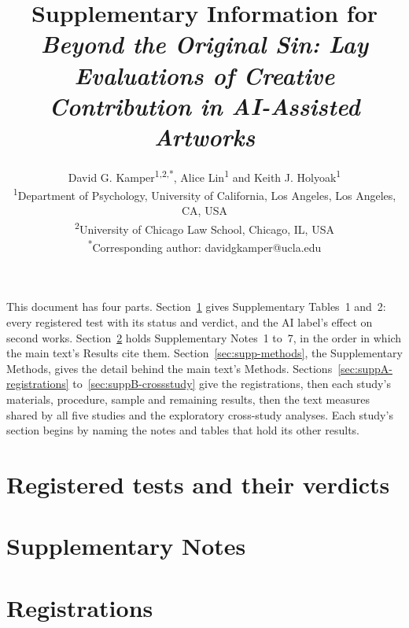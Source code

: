 \documentclass[11pt,a4paper]{article}
\title{Supplementary Information for\\
  \textit{Beyond the Original Sin: Lay Evaluations of Creative Contribution in AI-Assisted Artworks}}
\author{David G. Kamper\textsuperscript{1,2,*}, Alice Lin\textsuperscript{1} and Keith J. Holyoak\textsuperscript{1}\\[1ex]
  \small\textsuperscript{1}Department of Psychology, University of California, Los Angeles, Los Angeles, CA, USA\\
  \small\textsuperscript{2}University of Chicago Law School, Chicago, IL, USA\\
  \small\textsuperscript{*}Corresponding author: davidgkamper@ucla.edu}
\date{}
\begin{document}
\maketitle

\noindent This document has four parts. Section~\ref{sec:supp-verdicts} gives Supplementary Tables~1 and~2: every registered test with its status and verdict, and the AI label's effect on second works. Section~\ref{sec:supp-notes} holds Supplementary Notes~1 to~7, in the order in which the main text's Results cite them. Section~\ref{sec:supp-methods}, the Supplementary Methods, gives the detail behind the main text's Methods. Sections~\ref{sec:suppA-registrations} to~\ref{sec:suppB-crossstudy} give the registrations, then each study's materials, procedure, sample and remaining results, then the text measures shared by all five studies and the exploratory cross-study analyses. Each study's section begins by naming the notes and tables that hold its other results.

\tableofcontents
\clearpage

\section{Registered tests and their verdicts}\label{sec:supp-verdicts}




\section{Supplementary Notes}\label{sec:supp-notes}










\section{Registrations}

\end{document}
